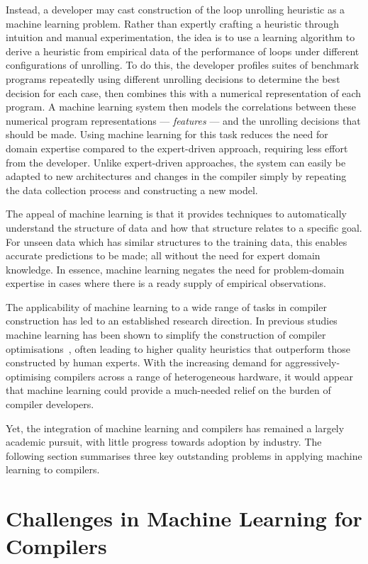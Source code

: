Instead, a developer may cast construction of the loop unrolling heuristic as a machine learning problem. Rather than expertly crafting a heuristic through intuition and manual experimentation, the idea is to use a learning algorithm to derive a heuristic from empirical data of the performance of loops under different configurations of unrolling. To do this, the developer profiles suites of benchmark programs repeatedly using different unrolling decisions to determine the best decision for each case, then combines this with a numerical representation of each program. A machine learning system then models the correlations between these numerical program representations --- \emph{features} --- and the unrolling decisions that should be made. Using machine learning for this task reduces the need for domain expertise compared to the expert-driven approach, requiring less effort from the developer. Unlike expert-driven approaches, the system can easily be adapted to new architectures and changes in the compiler simply by repeating the data collection process and constructing a new model.

The appeal of machine learning is that it provides techniques to automatically understand the structure of data and how that structure relates to a specific goal. For unseen data which has similar structures to the training data, this enables accurate predictions to be made; all without the need for expert domain knowledge. In essence, machine learning negates the need for problem-domain expertise in cases where there is a ready supply of empirical observations.

The applicability of machine learning to a wide range of tasks in compiler construction has led to an established research direction. In previous studies machine learning has been shown to simplify the construction of compiler optimisations~\cite{Ashouri2018,Wang2018}, often leading to higher quality heuristics that outperform those constructed by human experts. With the increasing demand for aggressively-optimising compilers across a range of heterogeneous hardware, it would appear that machine learning could provide a much-needed relief on the burden of compiler developers.

Yet, the integration of machine learning and compilers has remained a largely academic pursuit, with little progress towards adoption by industry. The following section summarises three key outstanding problems in applying machine learning to compilers.


\newpage
\section{Challenges in Machine Learning for Compilers}
\label{sec:intro-challenges}

